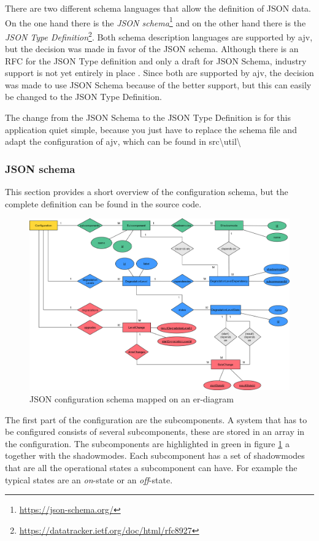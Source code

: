 There are two different schema languages that allow the definition of JSON data. On the one hand there is the \textit{JSON schema}\footnote{\url{https://json-schema.org/}} and on the other hand there is the \textit{JSON Type Definition}\footnote{\url{https://datatracker.ietf.org/doc/html/rfc8927}}. Both schema description languages are supported by ajv, but the decision was made in favor of the JSON schema. Although there is an RFC for the JSON Type definition and only a draft for JSON Schema, industry support is not yet entirely in place \cite{ajv_comparison}. Since both are supported by ajv, the decision was made to use JSON Schema because of the better support, but this can easily be changed to the JSON Type Definition.

The change from the JSON Schema to the JSON Type Definition is for this application quiet simple, because you just have to replace the schema file and adapt the configuration of ajv, which can be found in src\textbackslash util\textbackslash

\subsubsection{JSON schema}
This section provides a short overview of the configuration schema, but the complete definition can be found in the source code.

\begin{figure}[ht]
    \centering
    \includegraphics[width=\textwidth]{img/configuration_diagramm.png}
    \caption{JSON configuration schema mapped on an er-diagram}
    \label{fig:configuration_diagram}
\end{figure}

The first part of the configuration are the subcomponents. A system that has to be configured consists of several subcomponents, these are stored in an array in the configuration. The subcomponents are highlighted in green in figure \ref{fig:configuration_diagram} a together with the shadowmodes. Each subcomponent has a set of shadowmodes that are all the operational states a subcomponent can have. For example the typical states are an \textit{on}-state or an \textit{off}-state.

